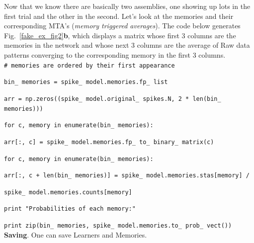 \documentclass[letter, 12pt]{article}
\theoremstyle{definition}
\theoremstyle{remark}
\begin{document}
Now that we know there are basically two assemblies, one showing up lots in the first trial and the other in the second.  Let's look at the
memories and their corresponding MTA's (\textit{memory triggered averages}).  The code below generates Fig.~\ref{fake_ex_fig2}\textbf{b}, which displays
a matrix whose first 3 columns are the memories in the network and whose next 3 columns are the average of Raw data patterns converging to the corresponding memory in the first 3 columns.  \\
 
\texttt{\# memories are ordered by their first appearance}
 
\texttt{bin\_\,memories = spike\_\,model.memories.fp\_\,list} 

\texttt{arr = np.zeros((spike\_\,model.original\_\,spikes.N, 2 * len(bin\_\,memories)))}

\texttt{for c, memory in enumerate(bin\_\,memories):}

\texttt{\quad \quad arr[:, c] = spike\_\,model.memories.fp\_\,to\_\,binary\_\,matrix(c)}

\texttt{for c, memory in enumerate(bin\_\,memories):}
 
\texttt{\quad \quad arr[:, c + len(bin\_\,memories)] = spike\_\,model.memories.stas[memory] /}

\texttt{\quad \quad \quad  spike\_\,model.memories.counts[memory]}

\texttt{print "Probabilities of each memory:"}

\texttt{print zip(bin\_\,memories, spike\_\,model.memories.to\_\,prob\_\,vect())} \\

\textbf{Saving}.  One can save Learners and Memories.



\scriptsize
\setlength{\bibsep}{0pt plus 0.3ex}

 
\end{document}

